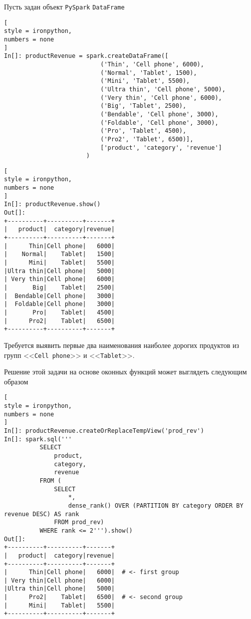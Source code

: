 \documentclass[%
	11pt,
	a4paper,
	utf8,
		]{article}
\begin{document}
\begin{minipage}[t]{0.6\textwidth}
Пусть задан объект \texttt{PySpark} \texttt{DataFrame}
\begin{lstlisting}[
style = ironpython,
numbers = none
]
In[]: productRevenue = spark.createDataFrame([
                           ('Thin', 'Cell phone', 6000),
                           ('Normal', 'Tablet', 1500),
                           ('Mini', 'Tablet', 5500),
                           ('Ultra thin', 'Cell phone', 5000),
                           ('Very thin', 'Cell phone', 6000),
                           ('Big', 'Tablet', 2500),
                           ('Bendable', 'Cell phone', 3000),
                           ('Foldable', 'Cell phone', 3000),
                           ('Pro', 'Tablet', 4500),
                           ('Pro2', 'Tablet', 6500)],
                           ['product', 'category', 'revenue']
                       )
\end{lstlisting}
\end{minipage}
\hspace*{2mm}
\begin{minipage}[t]{0.3\textwidth}
\begin{lstlisting}[
style = ironpython,
numbers = none
]
In[]: productRevenue.show()
Out[]:
+----------+----------+-------+
|   product|  category|revenue|
+----------+----------+-------+
|      Thin|Cell phone|   6000|
|    Normal|    Tablet|   1500|
|      Mini|    Tablet|   5500|
|Ultra thin|Cell phone|   5000|
| Very thin|Cell phone|   6000|
|       Big|    Tablet|   2500|
|  Bendable|Cell phone|   3000|
|  Foldable|Cell phone|   3000|
|       Pro|    Tablet|   4500|
|      Pro2|    Tablet|   6500|
+----------+----------+-------+
\end{lstlisting}
\end{minipage}

Требуется выявить первые два наименования наиболее дорогих продуктов из групп <<\texttt{Cell phone}>> и <<\texttt{Tablet}>>.

Решение этой задачи на основе оконных функций может выглядеть следующим образом

\begin{lstlisting}[
style = ironpython,
numbers = none
]
In[]: productRevenue.createOrReplaceTempView('prod_rev')
In[]: spark.sql('''
          SELECT
              product,
              category,
              revenue
          FROM (
              SELECT
                  *,
                  dense_rank() OVER (PARTITION BY category ORDER BY revenue DESC) AS rank
              FROM prod_rev)
          WHERE rank <= 2''').show()
Out[]:
+----------+----------+-------+
|   product|  category|revenue|
+----------+----------+-------+
|      Thin|Cell phone|   6000|  # <- first group
| Very thin|Cell phone|   6000|
|Ultra thin|Cell phone|   5000|
|      Pro2|    Tablet|   6500|  # <- second group
|      Mini|    Tablet|   5500|
+----------+----------+-------+
\end{lstlisting}
\end{document}
